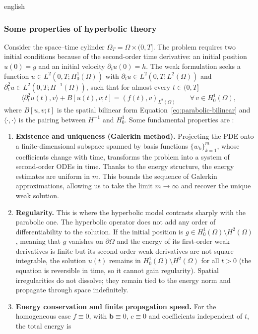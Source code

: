 \documentclass[0000.tex]{subfiles}
\begin{document}
\begin{hyphenrules}{english}
\subsubsection{Some properties of hyperbolic theory}
Consider the space--time cylinder $\Omega_T=\Omega\times(0,T]$. The problem requires two initial
conditions because of the second-order time derivative: an initial position $u(0)=g$ and an initial
velocity $\partial_t u(0)=h$. The weak formulation seeks a function $u\in L^2(0,T;H^1_0(\Omega))$ with
$\partial_t u\in L^2(0,T;L^2(\Omega))$ and $\partial_t^2u\in L^2(0,T;H^{-1}(\Omega))$, such that for
almost every $t\in(0,T]$
\begin{equation}
  \langle\partial_t^2u(t),v\rangle+B[u(t),v;t]=(f(t),v)_{L^2(\Omega)}\qquad\forall\,v\in H^1_0(\Omega),
  \label{eq:hyperbolic-weak}
\end{equation}
where $B[u,v;t]$ is the spatial bilinear form Equation~\eqref{eq:parabolic-bilinear} and $\langle\cdot,\cdot\rangle$
is the pairing between $H^{-1}$ and $H^1_0$. Some fundamental properties are \cite{evans2010}:
\begin{enumerate}
  \item \textbf{Existence and uniqueness (Galerkin method).} Projecting the PDE onto a
    finite-dimensional subspace spanned by basis functions $\{w_k\}_{k=1}^{m}$, whose coefficients
    change with time, transforms the problem into a system of second-order ODEs in time. Thanks to the
    energy structure, the energy estimates are uniform in $m$. This bounds the sequence of Galerkin
    approximations, allowing us to take the limit $m\to\infty$ and recover the unique weak solution.
  \item \textbf{Regularity.} This is where the hyperbolic model contrasts sharply with the parabolic
    one. The hyperbolic operator does not add any order of differentiability to the solution. If the
    initial position is $g\in H^1_0(\Omega)\setminus H^2(\Omega)$, meaning that $g$ vanishes on
    $\partial\Omega$ and the energy of its first-order weak derivatives is finite but its second-order
    weak derivatives are not square integrable, the solution $u(t)$ remains in
    $H^1_0(\Omega)\setminus H^2(\Omega)$ for all $t>0$ (the equation is reversible in time, so it cannot
    gain regularity). Spatial irregularities do not dissolve; they remain tied to the energy norm and
    propagate through space indefinitely.
  \item \textbf{Energy conservation and finite propagation speed.} For the homogeneous case
    $f\equiv0$, with $\mathbf{b}\equiv0$, $c\equiv0$ and coefficients independent of $t$, the total energy is

\end{enumerate}
\end{hyphenrules}
\end{document}
